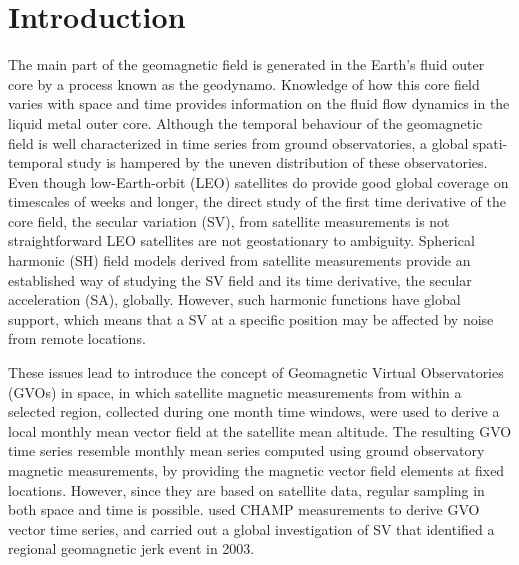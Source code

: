 \documentclass[extra,mreferee]{gji}
\begin{document}
\section{Introduction}
\label{sec:2}
The main part of the geomagnetic field is generated in the Earth's fluid outer core by a process known as the geodynamo. Knowledge of how this core field varies with space and time provides information on the fluid flow dynamics in the liquid metal outer core. Although the temporal behaviour of the geomagnetic field is well characterized in time series from ground observatories, a global spati-temporal study is hampered by the uneven distribution of these observatories. Even though low-Earth-orbit (LEO) satellites do provide good global coverage on timescales of weeks and longer, the direct study of the first time derivative of the core field, the secular variation (SV), from satellite measurements is not straightforward LEO satellites are not geostationary  to  ambiguity. Spherical harmonic (SH) field models derived from satellite measurements provide an established way of studying the SV field and its time derivative, the secular acceleration (SA), globally. However, such harmonic functions have global support, which means that a SV  at a specific position may be affected by noise from remote locations.

These issues lead \cite{Mandea_Olsen_2006} to introduce the concept of Geomagnetic Virtual Observatories (GVOs) in space, in which satellite magnetic measurements from within a selected region, collected during one month time windows, were used to derive a local monthly mean vector field at the satellite mean altitude. The resulting GVO time series resemble monthly mean series computed using ground observatory magnetic measurements, by providing the magnetic vector field elements at fixed locations. However, since they are based on satellite data, regular sampling in both space and time is possible.  \cite{Olsen_Mandea_2007} used CHAMP measurements to derive GVO vector  time series, and carried out a global investigation of SV that identified a regional geomagnetic jerk event in 2003. 
\end{document}
